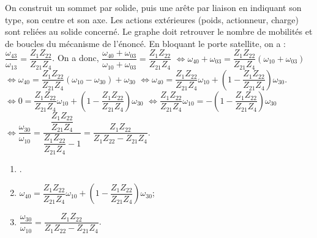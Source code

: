 \begin{corrigebox}
On construit un sommet par solide, puis une arête par liaison en
        indiquant son type, son centre et son axe. Les actions extérieures (poids,
        actionneur, charge) sont reliées au solide concerné. Le graphe doit retrouver le
        nombre de mobilités et de boucles du mécanisme de l'énoncé.
En bloquant le porte satellite, on a : $\dfrac{\omega_{43}}{\omega_{13}}=\dfrac{Z_{1}Z_{22}}{Z_{21}Z_{4}}$.
  On a donc, 
  $\dfrac{\omega_{40}+\omega_{03}}{\omega_{10}+\omega_{03}}=
\dfrac{Z_{1}Z_{22}}{Z_{21}Z_{4}}$
  $\Leftrightarrow \omega_{40}+\omega_{03}=\dfrac{Z_{1}Z_{22}}{Z_{21}Z_{4}}\left( \omega_{10}+\omega_{03} \right)$
  $\Leftrightarrow \omega_{40}=\dfrac{Z_{1}Z_{22}}{Z_{21}Z_{4}}\left( \omega_{10}-\omega_{30} \right) + \omega_{30}$
 $\Leftrightarrow \omega_{40}=\dfrac{Z_{1}Z_{22}}{Z_{21}Z_{4}}\omega_{10} +\left(1- \dfrac{Z_{1}Z_{22}}{Z_{21}Z_{4}}\right)\omega_{30}$.
$\Leftrightarrow 0=\dfrac{Z_{1}Z_{22}}{Z_{21}Z_{4}}\omega_{10} +\left(1- \dfrac{Z_{1}Z_{22}}{Z_{21}Z_{4}}\right)\omega_{30}$
$\Leftrightarrow  \dfrac{Z_{1}Z_{22}}{Z_{21}Z_{4}}\omega_{10} =-\left(1- \dfrac{Z_{1}Z_{22}}{Z_{21}Z_{4}}\right)\omega_{30}$
$\Leftrightarrow  \dfrac{\omega_{30}}{\omega_{10}} = \dfrac{ \dfrac{Z_{1}Z_{22}}{Z_{21}Z_{4}}}{ \dfrac{Z_{1}Z_{22}}{Z_{21}Z_{4}}-1}= \dfrac{ {Z_{1}Z_{22}}}{ {Z_{1}Z_{22}}-Z_{21}Z_{4}}$.

\begin{enumerate}
\item .
\item  $\omega_{40}=\dfrac{Z_{1}Z_{22}}{Z_{21}Z_{4}}\omega_{10} +\left(1- \dfrac{Z_{1}Z_{22}}{Z_{21}Z_{4}}\right)\omega_{30}$;
\item  $\dfrac{\omega_{30}}{\omega_{10}}= \dfrac{ {Z_{1}Z_{22}}}{ {Z_{1}Z_{22}}-Z_{21}Z_{4}}$.
\end{enumerate}
\end{corrigebox}
